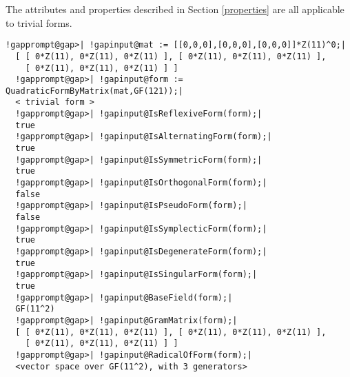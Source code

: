 \documentclass[a4paper,11pt]{report}
\begin{document}
{{\begin{Verbatim}[commandchars=!@|,fontsize=\small,frame=single,label=Example]
\end{Verbatim}
 The attributes and properties described in Section \ref{properties} are all applicable to trivial forms. 
\begin{Verbatim}[commandchars=!@|,fontsize=\small,frame=single,label=Example]
  !gapprompt@gap>| !gapinput@mat := [[0,0,0],[0,0,0],[0,0,0]]*Z(11)^0;|
  [ [ 0*Z(11), 0*Z(11), 0*Z(11) ], [ 0*Z(11), 0*Z(11), 0*Z(11) ], 
    [ 0*Z(11), 0*Z(11), 0*Z(11) ] ]
  !gapprompt@gap>| !gapinput@form := QuadraticFormByMatrix(mat,GF(121));|
  < trivial form >
  !gapprompt@gap>| !gapinput@IsReflexiveForm(form);|
  true
  !gapprompt@gap>| !gapinput@IsAlternatingForm(form);|
  true
  !gapprompt@gap>| !gapinput@IsSymmetricForm(form);|
  true
  !gapprompt@gap>| !gapinput@IsOrthogonalForm(form);|
  false
  !gapprompt@gap>| !gapinput@IsPseudoForm(form);|
  false
  !gapprompt@gap>| !gapinput@IsSymplecticForm(form);|
  true
  !gapprompt@gap>| !gapinput@IsDegenerateForm(form);|
  true
  !gapprompt@gap>| !gapinput@IsSingularForm(form);|
  true
  !gapprompt@gap>| !gapinput@BaseField(form);|
  GF(11^2)
  !gapprompt@gap>| !gapinput@GramMatrix(form);|
  [ [ 0*Z(11), 0*Z(11), 0*Z(11) ], [ 0*Z(11), 0*Z(11), 0*Z(11) ], 
    [ 0*Z(11), 0*Z(11), 0*Z(11) ] ]
  !gapprompt@gap>| !gapinput@RadicalOfForm(form);|
  <vector space over GF(11^2), with 3 generators>
   
\end{Verbatim}
 }

 }

  
\end{document}
